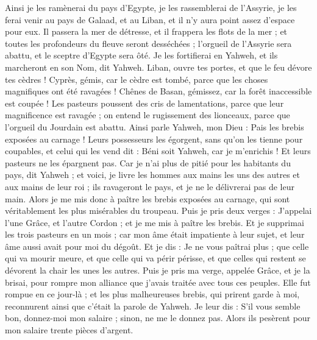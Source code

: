 \begin{multicols}{2}
Ainsi je les ramènerai du pays d'Egypte, je les rassemblerai de l'Assyrie, je les ferai venir au pays de Galaad, et au Liban, et il n'y aura point assez d'espace pour eux.
Il passera la mer de détresse, et il frappera les flots de la mer ; et toutes les profondeurs du fleuve seront desséchées ; l'orgueil de l'Assyrie sera abattu, et le sceptre d'Egypte sera ôté.
Je les fortifierai en Yahweh, et ils marcheront en son Nom, dit Yahweh.
\VerseOne{}Liban, ouvre tes portes, et que le feu dévore tes cèdres !
Cyprès, gémis, car le cèdre est tombé, parce que les choses magnifiques ont été ravagées ! Chênes de Basan, gémissez, car la forêt inaccessible est coupée !
Les pasteurs poussent des cris de lamentations, parce que leur magnificence est ravagée ; on entend le rugissement des lionceaux, parce que l'orgueil du Jourdain est abattu.
Ainsi parle Yahweh, mon Dieu : Pais les brebis exposées au carnage !
Leurs possesseurs les égorgent, sans qu'on les tienne pour coupables, et celui qui les vend dit : Béni soit Yahweh, car je m'enrichis ! Et leurs pasteurs ne les épargnent pas.
Car je n'ai plus de pitié pour les habitants du pays, dit Yahweh ; et voici, je livre les hommes aux mains les uns des autres et aux mains de leur roi ; ils ravageront le pays, et je ne le délivrerai pas de leur main.
Alors je me mis donc à paître les brebis exposées au carnage, qui sont véritablement les plus misérables du troupeau. Puis je pris deux verges : J'appelai l'une Grâce, et l'autre Cordon ; et je me mis à paître les brebis.
Et je supprimai les trois pasteurs en un mois ; car mon âme était impatiente à leur sujet, et leur âme aussi avait pour moi du dégoût.
Et je dis : Je ne vous paîtrai plus ; que celle qui va mourir meure, et que celle qui va périr périsse, et que celles qui restent se dévorent la chair les unes les autres.
Puis je pris ma verge, appelée Grâce, et je la brisai, pour rompre mon alliance que j'avais traitée avec tous ces peuples.
Elle fut rompue en ce jour-là ; et les plus malheureuses brebis, qui prirent garde à moi, reconnurent ainsi que c'était la parole de Yahweh.
Je leur dis : S'il vous semble bon, donnez-moi mon salaire ; sinon, ne me le donnez pas. Alors ils pesèrent pour mon salaire trente pièces d'argent.

\end{multicols}
